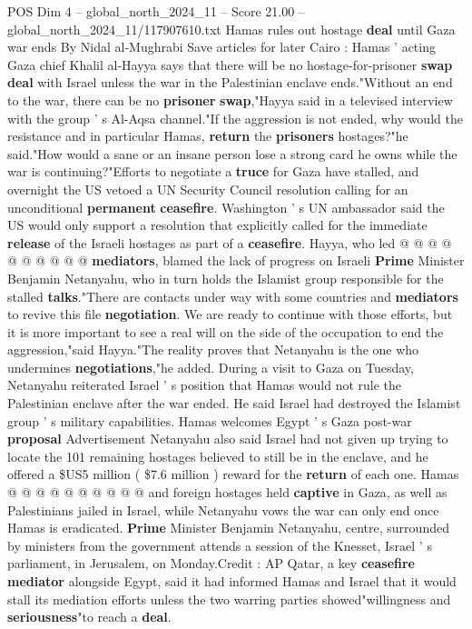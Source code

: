 \begin{textsample}{POS Dim 4 – global\_north\_2024\_11 – Score 21.00 – global\_north\_2024\_11/117907610.txt}  \label{ex:f4_pos_292}
Hamas rules out hostage \textbf{deal} until Gaza war ends By Nidal al-Mughrabi Save articles for later Cairo : Hamas ' acting Gaza chief Khalil al-Hayya says that there will be no hostage-for-prisoner \textbf{swap} \textbf{deal} with Israel unless the war in the Palestinian enclave ends."Without an end to the war, there can be no \textbf{prisoner} \textbf{swap},"Hayya said in a televised interview with the group ' s Al-Aqsa channel."If the aggression is not ended, why would the resistance and in particular Hamas, \textbf{return} the \textbf{prisoners} hostages?"he said."How would a sane or an insane person lose a strong card he owns while the war is continuing?"Efforts to negotiate a \textbf{truce} for Gaza have stalled, and overnight the US vetoed a UN Security Council resolution calling for an unconditional \textbf{permanent} \textbf{ceasefire}.
Washington ' s UN ambassador said the US would only support a resolution that explicitly called for the immediate \textbf{release} of the Israeli hostages as part of a \textbf{ceasefire}.
Hayya, who led @ @ @ @ @ @ @ @ @ @ \textbf{mediators}, blamed the lack of progress on Israeli \textbf{Prime} Minister Benjamin Netanyahu, who in turn holds the Islamist group responsible for the stalled \textbf{talks}."There are contacts under way with some countries and \textbf{mediators} to revive this file \textbf{negotiation}.
We are ready to continue with those efforts, but it is more important to see a real will on the side of the occupation to end the aggression,"said Hayya."The reality proves that Netanyahu is the one who undermines \textbf{negotiations},"he added.
During a visit to Gaza on Tuesday, Netanyahu reiterated Israel ' s position that Hamas would not rule the Palestinian enclave after the war ended.
He said Israel had destroyed the Islamist group ' s military capabilities.
Hamas welcomes Egypt ' s Gaza post-war \textbf{proposal} Advertisement Netanyahu also said Israel had not given up trying to locate the 101 remaining hostages believed to still be in the enclave, and he offered a \$US5 million ( \$7.6 million ) reward for the \textbf{return} of each one.
Hamas @ @ @ @ @ @ @ @ @ @ and foreign hostages held \textbf{captive} in Gaza, as well as Palestinians jailed in Israel, while Netanyahu vows the war can only end once Hamas is eradicated. \textbf{Prime} Minister Benjamin Netanyahu, centre, surrounded by ministers from the government attends a session of the Knesset, Israel ' s parliament, in Jerusalem, on Monday.Credit : AP Qatar, a key \textbf{ceasefire} \textbf{mediator} alongside Egypt, said it had informed Hamas and Israel that it would stall its mediation efforts unless the two warring parties showed"willingness and \textbf{seriousness}"to reach a \textbf{deal}.

\end{textsample}
